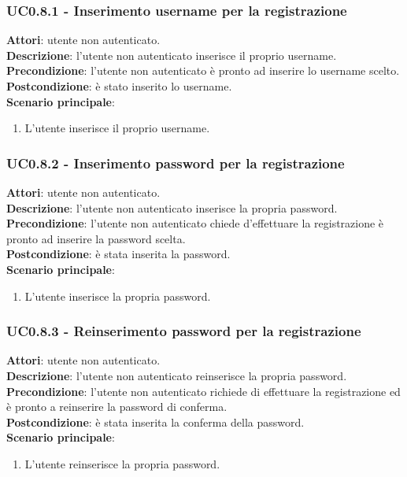 	\subsubsection{UC0.8.1 - Inserimento username per la registrazione}{
		\label{uc0.8.1}
		\textbf{Attori}: utente non autenticato. \\
		\textbf{Descrizione}: l'utente non autenticato inserisce il proprio username.	\\
		\textbf{Precondizione}: l'utente non autenticato è pronto ad inserire lo username scelto.	\\
		\textbf{Postcondizione}: è stato inserito lo username.\\
		\textbf{Scenario principale}:
		\begin{enumerate}
			\item L'utente inserisce il proprio username.
		\end{enumerate}
		}
	\subsubsection{UC0.8.2 - Inserimento password per la registrazione} {
		\label{uc0.8.2}
		\textbf{Attori}: utente non autenticato. \\
		\textbf{Descrizione}: l'utente non autenticato inserisce la propria password.	\\
		\textbf{Precondizione}: l'utente non autenticato chiede d'effettuare la registrazione è pronto ad inserire la password scelta.	\\
		\textbf{Postcondizione}: è stata inserita la password.\\
		\textbf{Scenario principale}:
		\begin{enumerate}
			\item L'utente inserisce la propria password.
		\end{enumerate}
		}
	\subsubsection{UC0.8.3 - Reinserimento password per la registrazione} {
		\label{uc0.8.3}
		\textbf{Attori}: utente non autenticato. \\
		\textbf{Descrizione}: l'utente non autenticato reinserisce la propria password.	\\
		\textbf{Precondizione}: l'utente non autenticato richiede di effettuare la registrazione ed è pronto a reinserire la password di conferma.	\\
		\textbf{Postcondizione}: è stata inserita la conferma della password.\\
		\textbf{Scenario principale}:
		\begin{enumerate}
			\item L'utente reinserisce la propria password.
		\end{enumerate}
		}
